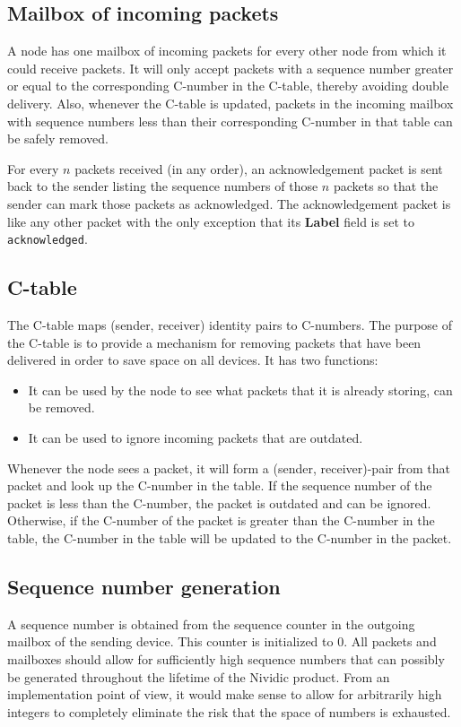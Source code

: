\documentclass{article}
\begin{document}
\subsection{Mailbox of incoming packets}
A node has one mailbox of incoming packets for every other node from which it could receive packets. It will only accept packets with a sequence number greater or equal to the corresponding C-number in the C-table, thereby avoiding double delivery. Also, whenever the C-table is updated, packets in the incoming mailbox with sequence numbers less than their corresponding C-number in that table can be safely removed. 

For every $n$ packets received (in any order), an acknowledgement packet is sent back to the sender listing the sequence numbers of those $n$ packets so that the sender can mark those packets as acknowledged. The acknowledgement packet is like any other packet with the only exception that its \textbf{Label} field is set to \texttt{acknowledged}.

\subsection{C-table}
The C-table maps (sender, receiver) identity pairs to C-numbers. The purpose of the C-table is to provide a mechanism for removing packets that have been delivered in order to save space on all devices. It has two functions:
\begin{itemize}
  \item It can be used by the node to see what packets that it is already storing, can be removed.
  \item It can be used to ignore incoming packets that are outdated.
\end{itemize}
Whenever the node sees a packet, it will form a (sender, receiver)-pair from that packet and look up the C-number in the table. If the sequence number of the packet is less than the C-number, the packet is outdated and can be ignored. Otherwise, if the C-number of the packet is greater than the C-number in the table, the C-number in the table will be updated to the C-number in the packet.

\subsection{Sequence number generation}
A sequence number is obtained from the sequence counter in the outgoing mailbox of the sending device. This counter is initialized to 0. All packets and mailboxes should allow for sufficiently high sequence numbers that can possibly be generated throughout the lifetime of the Nividic product. From an implementation point of view, it would make sense to allow for arbitrarily high integers to completely eliminate the risk that the space of numbers is exhausted.
\end{document}
